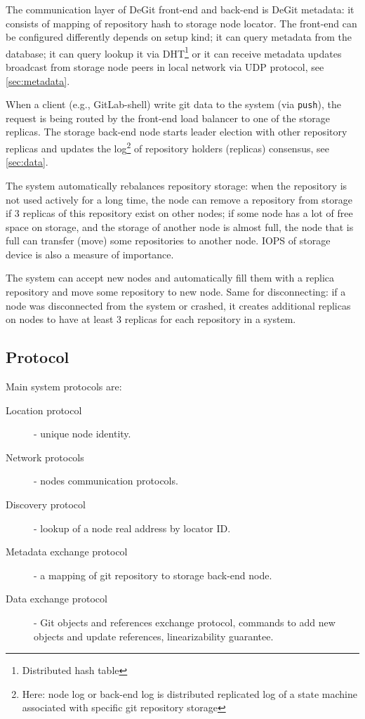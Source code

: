 \documentclass[acmlarge, screen, nonacm]{acmart}
\newcommand{\code}[1]{\texttt{#1}}
\begin{document}
The communication layer of DeGit front-end and back-end is DeGit metadata: it consists of mapping
of repository hash to storage node locator. The front-end can be configured differently depends on
setup kind; it can query metadata from the database; it can query lookup it via DHT\footnote{Distributed hash table}
or it can receive metadata updates broadcast from storage node peers in local network via UDP protocol,
see \ref{sec:metadata}.

When a client (e.g., GitLab-shell) write git data to the system (via \code{push}), the request is being routed
by the front-end load balancer to one of the storage replicas.
The storage back-end node starts leader election with other repository replicas and updates the log\footnote{Here: node log
or back-end log is distributed replicated log of a state machine associated with specific git repository storage}
of repository holders (replicas) consensus, see \ref{sec:data}.

The system automatically rebalances repository storage: when the repository is not used actively for a
long time, the node can remove a repository from storage if 3 replicas of this repository exist on other nodes;
if some node has a lot of free space on storage, and the storage of another node is almost full,
the node that is full can transfer (move) some repositories to another node. IOPS of storage device is also
a measure of importance.

The system can accept new nodes and automatically fill them with a replica repository and
move some repository to new node. Same for disconnecting: if a node was disconnected from the system or crashed,
it creates additional replicas on nodes to have at least 3 replicas for each repository in a system.

\subsection{Protocol}
Main system protocols are:
\begin{description}
  \item[Location protocol] - unique node identity.
  \item[Network protocols] - nodes communication protocols.
  \item[Discovery protocol] - lookup of a node real address by locator ID.
  \item[Metadata exchange protocol] - a mapping of git repository to storage back-end node.
  \item[Data exchange protocol] - Git objects and references exchange protocol,
    commands to add new objects and update references, linearizability guarantee.
\end{description}
\end{document}

